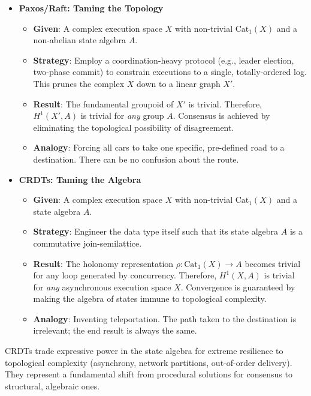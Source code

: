 \documentclass[
]{article}
\providecommand{\tightlist}{%
  \setlength{\itemsep}{0pt}\setlength{\parskip}{0pt}}
\begin{document}
\begin{itemize}
\tightlist
\item
  \textbf{Paxos/Raft: Taming the Topology}

  \begin{itemize}
  \tightlist
  \item
    \textbf{Given}: A complex execution space \(X\) with non-trivial
    \(\text{Cat}_1(X)\) and a non-abelian state algebra \(A\).
  \item
    \textbf{Strategy}: Employ a coordination-heavy protocol (e.g.,
    leader election, two-phase commit) to constrain executions to a
    single, totally-ordered log. This prunes the complex \(X\) down to a
    linear graph \(X'\).
  \item
    \textbf{Result}: The fundamental groupoid of \(X'\) is trivial.
    Therefore, \(H^1(X', A)\) is trivial for \emph{any} group \(A\).
    Consensus is achieved by eliminating the topological possibility of
    disagreement.
  \item
    \textbf{Analogy}: Forcing all cars to take one specific, pre-defined
    road to a destination. There can be no confusion about the route.
  \end{itemize}
\item
  \textbf{CRDTs: Taming the Algebra}

  \begin{itemize}
  \tightlist
  \item
    \textbf{Given}: A complex execution space \(X\) with non-trivial
    \(\text{Cat}_1(X)\) and a state algebra \(A\).
  \item
    \textbf{Strategy}: Engineer the data type itself such that its state
    algebra \(A\) is a commutative join-semilattice.
  \item
    \textbf{Result}: The holonomy representation
    \(\rho: \text{Cat}_1(X) \to A\) becomes trivial for any loop
    generated by concurrency. Therefore, \(H^1(X, A)\) is trivial for
    \emph{any} asynchronous execution space \(X\). Convergence is
    guaranteed by making the algebra of states immune to topological
    complexity.
  \item
    \textbf{Analogy}: Inventing teleportation. The path taken to the
    destination is irrelevant; the end result is always the same.
  \end{itemize}
\end{itemize}

CRDTs trade expressive power in the state algebra for extreme resilience
to topological complexity (asynchrony, network partitions, out-of-order
delivery). They represent a fundamental shift from procedural solutions
for consensus to structural, algebraic ones.
\end{document}
